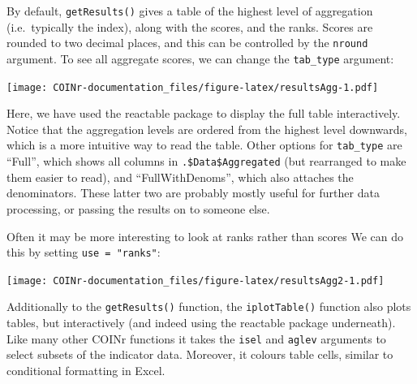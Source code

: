 \documentclass[
]{book}
\newenvironment{Shaded}{\begin{snugshade}}{\end{snugshade}}
\newcommand{\DataTypeTok}[1]{\textcolor[rgb]{0.13,0.29,0.53}{#1}}
\newcommand{\KeywordTok}[1]{\textcolor[rgb]{0.13,0.29,0.53}{\textbf{#1}}}
\newcommand{\NormalTok}[1]{#1}
\newcommand{\OperatorTok}[1]{\textcolor[rgb]{0.81,0.36,0.00}{\textbf{#1}}}
\newcommand{\StringTok}[1]{\textcolor[rgb]{0.31,0.60,0.02}{#1}}
\begin{document}
By default, \texttt{getResults()} gives a table of the highest level of aggregation (i.e.~typically the index), along with the scores, and the ranks. Scores are rounded to two decimal places, and this can be controlled by the \texttt{nround} argument. To see all aggregate scores, we can change the \texttt{tab\_type} argument:

\begin{Shaded}
\end{Shaded}

\texttt{[image: COINr-documentation\_files/figure-latex/resultsAgg-1.pdf]}

Here, we have used the reactable package to display the full table interactively. Notice that the aggregation levels are ordered from the highest level downwards, which is a more intuitive way to read the table. Other options for \texttt{tab\_type} are ``Full'', which shows all columns in \texttt{.\$Data\$Aggregated} (but rearranged to make them easier to read), and ``FullWithDenoms'', which also attaches the denominators. These latter two are probably mostly useful for further data processing, or passing the results on to someone else.

Often it may be more interesting to look at ranks rather than scores We can do this by setting \texttt{use\ =\ "ranks"}:

\begin{Shaded}
\end{Shaded}

\texttt{[image: COINr-documentation\_files/figure-latex/resultsAgg2-1.pdf]}

Additionally to the \texttt{getResults()} function, the \texttt{iplotTable()} function also plots tables, but interactively (and indeed using the reactable package underneath). Like many other COINr functions it takes the \texttt{isel} and \texttt{aglev} arguments to select subsets of the indicator data. Moreover, it colours table cells, similar to conditional formatting in Excel.
\end{document}
